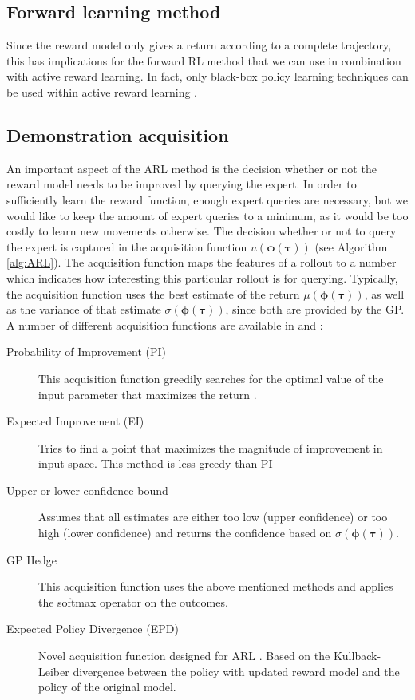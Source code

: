 \documentclass[mscThesis.tex]{subfiles}
\begin{document}
\subsection{Forward learning method}
Since the reward model only gives a return according to a complete trajectory, this has implications for the forward RL method that we can use in combination with active reward learning. In fact, only black-box policy learning techniques can be used within active reward learning \cite{Daniel2014}.      

\subsection{Demonstration acquisition}
An important aspect of the ARL method is the decision whether or not the reward model needs to be improved by querying the expert. In order to sufficiently learn the reward function, enough expert queries are necessary, but we would like to keep the amount of expert queries to a minimum, as it would be too costly to learn new movements otherwise. 
The decision whether or not to query the expert is captured in the acquisition function $u( \bm{\phi} (\bm{\tau}))$ (see Algorithm \ref{alg:ARL}). The acquisition function maps the features of a rollout to a number which indicates how interesting this particular rollout is for querying. Typically, the acquisition function uses the best estimate of the return $\mu(\bm{\phi}(\bm{\tau}))$, as well as the variance of that estimate $\sigma(\bm{\phi}(\bm{\tau}))$, since both are provided by the GP. A number of different acquisition functions are available in \cite{hoffman2011portfolio} and \cite{Daniel2014}: 
\begin{description}
\item [Probability of Improvement (PI)] This acquisition function greedily searches for the optimal value of the input parameter that maximizes the return \cite{kushner1964}.
\item [Expected Improvement (EI)] Tries to find a point that maximizes the magnitude of improvement in input space. This method is less greedy than PI
\item [Upper or lower confidence bound] Assumes that all estimates are either too low (upper confidence) or too high (lower confidence) and returns the confidence based on $\sigma(\bm{\phi}(\bm{\tau}))$.
\item [GP Hedge] This acquisition function uses the above mentioned methods and applies the softmax operator on the outcomes.
\item [Expected Policy Divergence (EPD)] Novel acquisition function designed for ARL \cite{Daniel2014}. Based on the Kullback-Leiber divergence between the policy with updated reward model and the policy of the original model.
\end{description}
\end{document}
